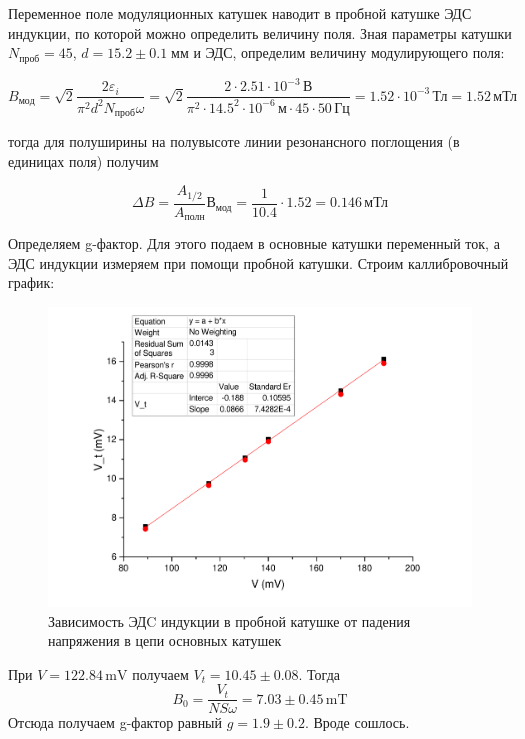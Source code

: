 \documentclass[a4paper,12pt]{article}
\begin{document}
    
    
    Переменное поле модуляционных катушек наводит в пробной катушке ЭДС индукции,
по которой можно определить величину поля. 
Зная параметры катушки $N_{проб} = 45$, $d = 15.2 \pm 0.1 \; мм$ и ЭДС, определим величину модулирующего поля:

\begin{equation}
B_{мод} = \sqrt{2} \frac{2\varepsilon_i}{\pi^2 d^2N_{проб} \omega} = \sqrt{2} \frac{2 \cdot 2.51 \cdot 10^{-3}\, \text{В}}{\pi^2 \cdot 14.5^2 \cdot 10^{-6} \, \text{м} \cdot 45 \cdot 50\, \text{Гц}}  = 1.52 \cdot 10^{-3} \,\text{Тл} = 1.52 \, \text{мТл}
\end{equation}

тогда для полуширины на полувысоте линии резонансного поглощения (в единицах поля) получим

\begin{equation}
\Delta B  = \frac{A_{1/2}}{A_{\text{полн}}} В_{\text{мод}} = \frac{1}{10.4}\cdot 1.52 = 0.146 \,\text{мТл}  
\end{equation}

Определяем g-фактор. Для этого подаем в основные катушки переменный ток, 
а ЭДС индукции измеряем при помощи пробной катушки. Строим каллибровочный график:

\begin{figure}
    \centering
    \includegraphics[width = 0.8\linewidth]{cal}
    \caption{Зависимость ЭДC индукции в пробной катушке от падения напряжения в цепи основных катушек}
    \label{fig:my_label}
\end{figure}
    
    При $V = 122.84\,\mathrm{mV}$ получаем $V_t = 10.45\pm0.08$. Тогда
    \begin{equation}
        B_0 = \frac{V_t}{NS\omega} = 7.03\pm 0.45\,\mathrm{mT}
    \end{equation}
    Отсюда получаем g-фактор равный $g = 1.9\pm0.2$. Вроде сошлось.
    
\end{document}
